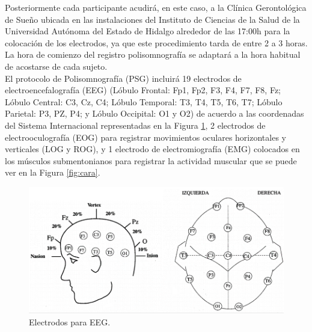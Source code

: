 \documentclass[letterpaper,titlepage,12pt,draft]{report}
\begin{document}
Posteriormente cada participante acudir\'a, en este caso, a la Cl\'inica Gerontol\'ogica de Sue\~no ubicada en las instalaciones del Instituto de Ciencias de la Salud de la Universidad Aut\'onoma del Estado de Hidalgo alrededor de las 17:00h para la colocaci\'on de los electrodos, ya que este procedimiento tarda de entre 2 a 3 horas. La hora de comienzo del registro polisomnograf\'ia se adaptar\'a a la hora habitual de acostarse de cada sujeto.\\

El protocolo de Polisomnograf\'ia (PSG) incluir\'a 19 electrodos de electroencefalograf\'ia (EEG) (L\'obulo Frontal: Fp1, Fp2, F3, F4, F7, F8, Fz; L\'obulo Central: C3, Cz, C4; L\'obulo Temporal: T3, T4, T5, T6, T7; L\'obulo Parietal: P3, PZ, P4; y L\'obulo Occipital: O1 y O2) de acuerdo a las coordenadas del Sistema Internacional representadas en la Figura \ref{fig:eeg}, 2 electrodos de electrooculograf\'ia (EOG) para registrar movimientos oculares horizontales y verticales (LOG y ROG), y 1 electrodo de electromiograf\'ia (EMG) colocados en los m\'usculos submentonianos para registrar la actividad muscular que se puede ver en la Figura \ref{fig:cara}.

\begin{figure}[H]
\begin{center}
\includegraphics[scale=0.7]{eeg0.png}
\caption{Electrodos para EEG.} 
\label{fig:eeg}
\end{center}
\end{figure}
\end{document}
